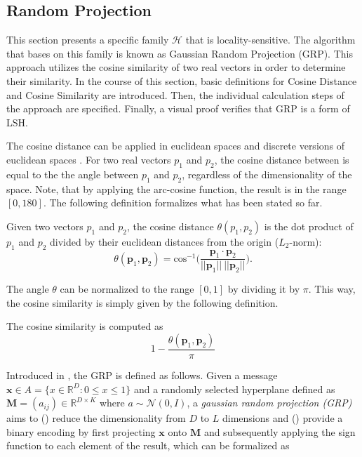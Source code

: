 \subsection{Random Projection}\label{subsec:random_projection}

This section presents a specific family $\mathcal{H}$ that is locality-sensitive. The algorithm that bases on this family is known as Gaussian Random Projection (GRP). This approach utilizes the cosine similarity of two real vectors in order to determine their similarity. In the course of this section, basic definitions for Cosine Distance and Cosine Similarity are introduced. Then, the individual calculation steps of the approach are specified. Finally, a visual proof verifies that GRP is a form of LSH.

The cosine distance can be applied in euclidean spaces and discrete versions of euclidean spaces \cite[95]{leskovec_rajaraman_ullman_2014}. For two real vectors $p_1$ and $p_2$, the cosine distance between is equal to the the angle between $p_1$ and $p_2$, regardless of the dimensionality of the space. Note, that by applying the arc-cosine function, the result is in the range $[0, 180]$. The following definition formalizes what has been stated so far.

\begin{definition}
    Given two vectors $p_1$ and $p_2$, the cosine distance $\theta(p_1, p_2)$ is the dot product of $p_1$ and $p_2$ divided by their euclidean distances from the origin ($L_2$-norm):
    \begin{equation}
        \theta(\bm{p}_1, \bm{p}_2) = \text{cos}^{-1} \bigg( \frac{\bm{p}_1 \cdot \bm{p}_2}{||\bm{p}_1|| \: ||\bm{p}_2||} \Bigg).
    \end{equation}
\end{definition}

The angle $\theta$ can be normalized to the range $[0, 1]$ by dividing it by $\pi$. This way, the cosine similarity is simply given by the following definition.

\begin{definition}
    The cosine similarity is computed as
    \begin{equation}
        1- \frac{\theta(\bm{p}_1, \bm{p}_2)}{\pi}
    \end{equation}
\end{definition}

Introduced in \cite{charikar2002similarity}, the GRP is defined as follows. Given a message $\bm{x} \in A = \{x \in \mathbb{R}^D : 0 \leq x \leq 1 \}$ and a randomly selected hyperplane defined as $\bm{M}=(a_{ij}) \in \mathbb{R}^{D \times K}$ where $a \sim \mathcal{N}(0, I)$, a \textit{gaussian random projection (GRP)} aims to () reduce the dimensionality from $D$ to $L$ dimensions and () provide a binary encoding by first projecting $\bm{x}$ onto $\bm{M}$ and subsequently applying the sign function to each element of the result, which can be formalized as

